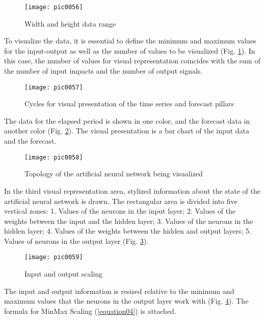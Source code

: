 \begin{figure}[h]
\centering
\texttt{[image: pic0056]}
\caption{Width and height data range}
\label{fig:pic0056}
\end{figure}
\FloatBarrier

To visualize the data, it is essential to define the minimum and maximum values for the input-output as well as the number of values to be visualized (Fig. \ref{fig:pic0056}). In this case, the number of values for visual representation coincides with the sum of the number of input impacts and the number of output signals.

\begin{figure}[h]
\centering
\texttt{[image: pic0057]}
\caption{Cycles for visual presentation of the time series and forecast pillars}
\label{fig:pic0057}
\end{figure}
\FloatBarrier

The data for the elapsed period is shown in one color, and the forecast data in another color (Fig. \ref{fig:pic0057}). The visual presentation is a bar chart of the input data and the forecast.

\begin{figure}[h]
\centering
\texttt{[image: pic0058]}
\caption{Topology of the artificial neural network being visualized}
\label{fig:pic0058}
\end{figure}
\FloatBarrier

In the third visual representation area, stylized information about the state of the artificial neural network is drawn. The rectangular area is divided into five vertical zones: 1. Values of the neurons in the input layer; 2. Values of the weights between the input and the hidden layer; 3. Values of the neurons in the hidden layer; 4. Values of the weights between the hidden and output layers; 5. Values of neurons in the output layer (Fig. \ref{fig:pic0058}).

\begin{figure}[h]
\centering
\texttt{[image: pic0059]}
\caption{Input and output scaling}
\label{fig:pic0059}
\end{figure}
\FloatBarrier

The input and output information is resized relative to the minimum and maximum values that the neurons in the output layer work with (Fig. \ref{fig:pic0059}). The formula for MinMax Scaling (\ref{equation04}) is attached.

